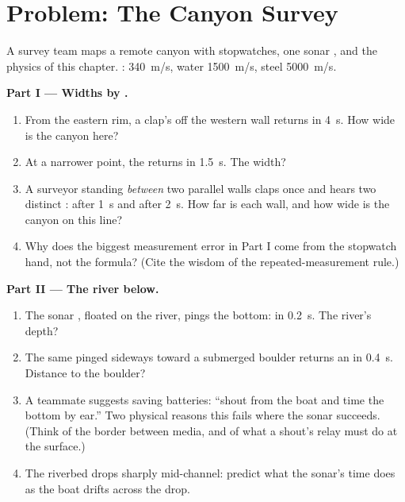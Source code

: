 \section{Problem: The Canyon Survey}

\begin{problem}\label{pb:g7:sound-production:1}
A survey team maps a remote canyon with stopwatches, one sonar
, and the physics of this chapter. : 
\qty{340}{m/s}, water \qty{1500}{m/s}, steel \qty{5000}{m/s}.

\medskip\noindent\textbf{Part I --- Widths by .}
\begin{enumerate}
  \item From the eastern rim, a clap's  off the western
        wall returns in \qty{4}{s}. How wide is the canyon
        here?
  \item At a narrower point, the  returns in \qty{1.5}{s}.
        The width?
  \item A surveyor standing \emph{between} two parallel walls
        claps once and hears two distinct : after
        \qty{1}{s} and after \qty{2}{s}. How far is each wall,
        and how wide is the canyon on this line?
  \item Why does the biggest measurement error in Part I come
        from the stopwatch hand, not the formula? (Cite the
        wisdom of the repeated-measurement rule.)
\end{enumerate}

\medskip\noindent\textbf{Part II --- The river below.}
\begin{enumerate}[resume]
  \item The sonar , floated on the river, pings the bottom:
         in \qty{0.2}{s}. The river's depth?
  \item The same  pinged sideways toward a submerged
        boulder returns an  in \qty{0.4}{s}. Distance to
        the boulder?
  \item A teammate suggests saving batteries: ``shout from the
        boat and time the bottom  by ear.'' Two physical
        reasons this fails where the sonar succeeds. (Think of
        the border between media, and of what a shout's 
        relay must do at the surface.)
  \item The riverbed drops sharply mid-channel: predict what
        the sonar's  time does as the boat drifts across
        the drop.
\end{enumerate}


\end{problem}
